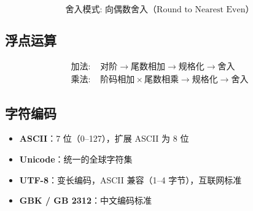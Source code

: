 \begin{equation}
\text{舍入模式: 向偶数舍入（Round to Nearest Even）}
\end{equation}

\subsection{浮点运算}

\begin{equation}
\begin{aligned}
\text{加法: } & \text{对阶} \rightarrow \text{尾数相加} \rightarrow \text{规格化} \rightarrow \text{舍入} \\
\text{乘法: } & \text{阶码相加} \times \text{尾数相乘} \rightarrow \text{规格化} \rightarrow \text{舍入}
\end{aligned}
\end{equation}

\subsection{字符编码}

\begin{itemize}
    \item \textbf{ASCII}：7 位（0–127），扩展 ASCII 为 8 位
    \item \textbf{Unicode}：统一的全球字符集
    \item \textbf{UTF-8}：变长编码，ASCII 兼容（1–4 字节），互联网标准
    \item \textbf{GBK / GB 2312}：中文编码标准
\end{itemize}
